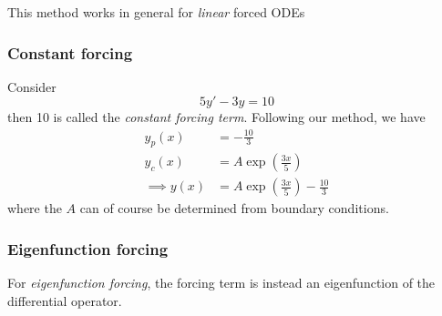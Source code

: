 \documentclass{../template/note}
\begin{document}
    This method works in general for \emph{linear} forced ODEs

    \subsubsection{Constant forcing}

    \begin{example}
        Consider
        \[
            5y' - 3y = 10
        \]
        then 10 is called the \emph{constant forcing term}. Following our method, we have
        \begin{align*}
            y_p(x) &= -\frac{10}{3} \\
            y_c(x) &= A\exp\left(\frac{3x}{5}\right) \\
            \implies y(x) &= A\exp\left(\frac{3x}{5}\right) - \frac{10}{3}
        \end{align*}
        where the \(A\) can of course be determined from boundary conditions.        
    \end{example}
    
    \subsubsection{Eigenfunction forcing}

    For \emph{eigenfunction forcing}, the forcing term is instead an eigenfunction of the differential operator.
\end{document}
